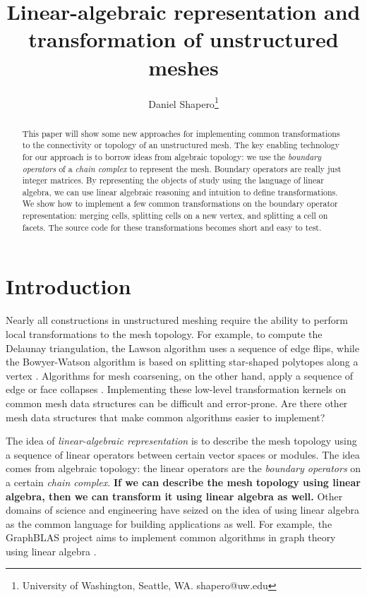 \documentclass[twocolumn,leqno,twocolumn]{article}
\begin{document}
\title{\Large Linear-algebraic representation and transformation of unstructured meshes}
\author{Daniel Shapero\thanks{University of Washington, Seattle, WA. shapero@uw.edu}}
\date{}

\maketitle


\begin{abstract} \small\baselineskip=9pt This paper will show some new approaches for implementing common transformations to the connectivity or topology of an unstructured mesh.
The key enabling technology for our approach is to borrow ideas from algebraic topology: we use the \emph{boundary operators} of a \emph{chain complex} to represent the mesh.
Boundary operators are really just integer matrices.
By representing the objects of study using the language of linear algebra, we can use linear algebraic reasoning and intuition to define transformations.
We show how to implement a few common transformations on the boundary operator representation: merging cells, splitting cells on a new vertex, and splitting a cell on facets.
The source code for these transformations becomes short and easy to test.
\end{abstract}


\section{Introduction}

Nearly all constructions in unstructured meshing require the ability to perform local transformations to the mesh topology.
For example, to compute the Delaunay triangulation, the Lawson algorithm uses a sequence of edge flips, while the Bowyer-Watson algorithm is based on splitting star-shaped polytopes along a vertex \cite{cheng2013delaunay}.
Algorithms for mesh coarsening, on the other hand, apply a sequence of edge or face collapses \cite{gueziec1995surface}.
Implementing these low-level transformation kernels on common mesh data structures can be difficult and error-prone.
Are there other mesh data structures that make common algorithms easier to implement?

The idea of \emph{linear-algebraic representation} is to describe the mesh topology using a sequence of linear operators between certain vector spaces or modules.
The idea comes from algebraic topology: the linear operators are the \emph{boundary operators} on a certain \emph{chain complex}.
\textbf{If we can describe the mesh topology using linear algebra, then we can transform it using linear algebra as well.}
Other domains of science and engineering have seized on the idea of using linear algebra as the common language for building applications as well.
For example, the GraphBLAS project aims to implement common algorithms in graph theory using linear algebra \cite{mattson2013standards}.
\end{document}
